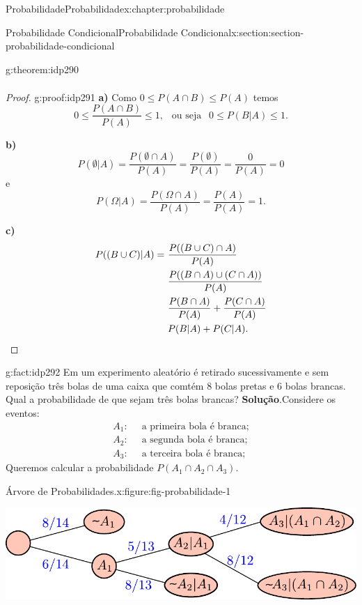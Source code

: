 \documentclass[oneside,10pt,]{book}
\newcommand{\blocktitlefont}{\relax}
\newcommand{\terminology}[1]{\textbf{#1}}
\newcommand{\qedhere}{\relax}
\numberwithin{equation}{section}
\newcommand{\amp}{&}
\begin{document}
\begin{chapterptx}{Probabilidade}{}{Probabilidade}{}{}{x:chapter:probabilidade}
\begin{sectionptx}{Probabilidade Condicional}{}{Probabilidade Condicional}{}{}{x:section:section-probabilidade-condicional}
\begin{theorem}{}{}{g:theorem:idp290}
\begin{align*}
\end{align*}
%
\end{theorem}
\begin{proof}{}{g:proof:idp291}
\terminology{a)} Como \(0\leq P(A\cap B)\leq P(A)\) temos%
\begin{equation*}
0\leq \frac{P(A\cap B)}{P(A)}\leq 1, ~~ \text{ ou seja }~~ 0\leq P(B|A)\leq 1. 
\end{equation*}
%
\par
\terminology{b)}%
\begin{equation*}
P(\emptyset|A) = \frac{P(\emptyset\cap A)}{P(A)} = \frac{P(\emptyset)}{P(A)} = \frac{0}{P(A)} = 0
\end{equation*}
e%
\begin{equation*}
P(\Omega|A) = \frac{P(\Omega\cap A)}{P(A)} = \frac{P(A)}{P(A)} = 1. 
\end{equation*}
%
\par
\terminology{c)}%
\begin{align*}
P((B\cup C)|A) = \amp ~ \frac{P((B\cup C)\cap A)}{P(A)} \\
\amp ~ \frac{P((B\cap A)\cup (C\cap A))}{P(A)} \\
\amp ~ \frac{P(B\cap A)}{P(A)} + \frac{P(C\cap A)}{P(A)} \\
\amp ~ P(B|A) + P(C|A). \qedhere
\end{align*}
%
\end{proof}
\begin{fact}{}{}{g:fact:idp292}%
Em um experimento aleatório é retirado sucessivamente e sem reposição três bolas de uma caixa que comtém 8 bolas pretas e 6 bolas brancas. Qual a probabilidade de que sejam três bolas brancas?%
\textbf{\blocktitlefont Solução}.\quad{}Considere os eventos:%
\begin{align*}
A_1: \amp ~ \text{ a primeira bola é branca;} \\
A_2: \amp ~ \text{ a segunda bola é branca;} \\
A_3: \amp ~ \text{ a terceira bola é branca;} 
\end{align*}
Queremos calcular a probabilidade \(P(A_1\cap A_2\cap A_3)\).%
\begin{figureptx}{Árvore de Probabilidades.}{x:figure:fig-probabilidade-1}{}%
\begin{image}{0.1}{0.8}{0.1}%
\includegraphics[width=\linewidth]{images/pcondicional1}

\end{image}
\end{figureptx}
\end{fact}
\end{sectionptx}
\end{chapterptx}
\end{document}
